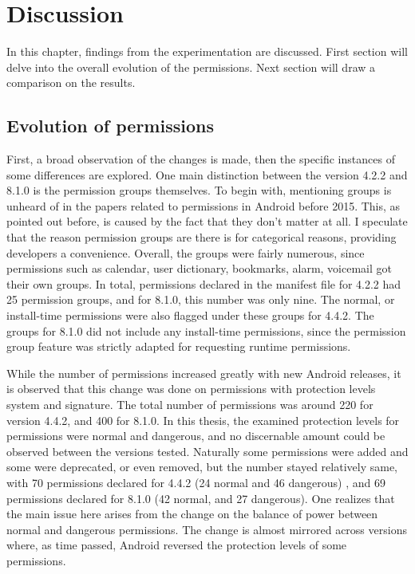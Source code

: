 \documentclass[
  a4paper,  %
  twoside,  %
  bibliography=totoc,
  headsepline,
  cleardoublepage=empty,
  parskip=half,
  draft=false,
  open=any
]{scrbook}
\begin{document}
\chapter{Discussion}
\label{cha:discussion}
In this chapter, findings from the experimentation are discussed. First section will delve into the overall evolution of the permissions. Next section will draw a comparison on the results. 

\section{Evolution of permissions}
First, a broad observation of the changes is made, then the specific instances of some differences are explored. One main distinction between the version 4.2.2 and 8.1.0 is the permission groups themselves. To begin with, mentioning groups is unheard of in the papers related to permissions in Android before 2015. This, as pointed out before, is caused by the fact that they don't matter at all. I speculate that the reason permission groups are there is for categorical reasons, providing developers a convenience. Overall, the groups were fairly numerous, since permissions such as calendar, user dictionary, bookmarks, alarm, voicemail got their own groups. In total, permissions declared in the manifest file for 4.2.2 had 25 permission groups, and for 8.1.0, this number was only nine. The normal, or install-time permissions were also flagged under these groups for 4.4.2. The groups for 8.1.0 did not include any install-time permissions, since the permission group feature was strictly adapted for requesting runtime permissions.

While the number of permissions increased greatly with new Android releases, it is observed that this change was done on permissions with protection levels system and signature. The  total number of permissions was around 220 for version 4.4.2, and 400 for 8.1.0. In this thesis, the examined protection levels for permissions were normal and dangerous, and no discernable amount could be observed between the versions tested. Naturally some permissions were added and some were deprecated, or even removed, but the number stayed relatively same, with 70 permissions declared for 4.4.2 (24 normal and 46 dangerous) , and 69 permissions declared for 8.1.0 (42 normal, and 27 dangerous). One realizes that the main issue here arises from the change on the balance of power between normal and dangerous permissions. The change is almost mirrored across versions where, as time passed, Android reversed the protection levels of some permissions. 
\end{document}

